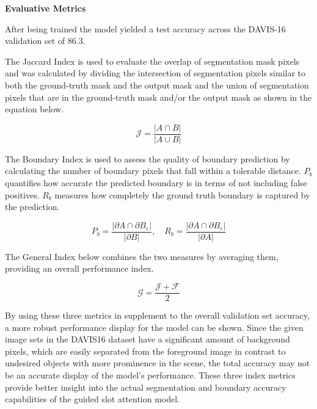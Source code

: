 \documentclass{article}
\theoremstyle{plain}
\theoremstyle{definition}
\theoremstyle{remark}
\begin{document}
\textbf{Evaluative Metrics}

\hspace{20pt} After being trained the model yielded a test accuracy across the DAVIS-16 validation set of 86.3. 

The Jaccard Index is used to evaluate the overlap of segmentation mask pixels and was calculated by dividing the intersection of segmentation pixels similar to both the ground-truth mask and the output mask and the union of segmentation pixels that are in the ground-truth mask and/or the output mask as shown in the equation below.

\begin{equation}
\mathcal{J} = \frac{|A \cap B|}{|A \cup B|}
\end{equation}

The Boundary Index is used to assess the quality of boundary prediction by calculating the number of boundary pixels that fall within a tolerable distance. $P_b$ quantifies how accurate the predicted boundary is in terms of not including false positives. $R_b$ measures how completely the ground truth boundary is captured by the prediction.

\begin{equation}
P_b = \frac{|\partial A \cap \partial B_\varepsilon|}{|\partial B|}, \quad
R_b = \frac{|\partial A \cap \partial B_\varepsilon|}{|\partial A|}
\end{equation}

The General Index below combines the two measures by averaging them, providing an overall performance index.

\begin{equation}
\mathcal{G} = \frac{\mathcal{J} + \mathcal{F}}{2}
\end{equation}

 By using these three metrics in supplement to the overall validation set accuracy, a more robust performance display for the model can be shown. Since the given image sets in the DAVIS16 dataset have a significant amount of background pixels, which are easily separated from the foreground image in contrast to undesired objects with more prominence in the scene, the total accuracy may not be an accurate display of the model's performance. These three index metrics provide better insight into the actual segmentation and boundary accuracy capabilities of the guided slot attention model. 
\end{document}

